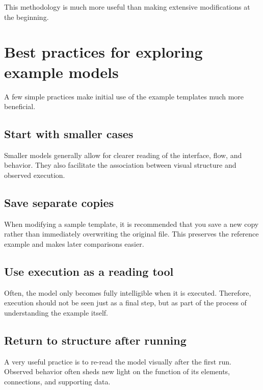 This methodology is much more useful than making extensive modifications at the beginning.

\section{Best practices for exploring example models}
\label{sec:cap4_boas_praticas_explorar_modelos}

A few simple practices make initial use of the example templates much more beneficial.

\subsection{Start with smaller cases}
\label{subsec:cap4_comece_por_casos_menores}

Smaller models generally allow for clearer reading of the interface, flow, and behavior. They also facilitate the association between visual structure and observed execution.

\subsection{Save separate copies}
\label{subsec:cap4_salve_copias_separadas}

When modifying a sample template, it is recommended that you save a new copy rather than immediately overwriting the original file. This preserves the reference example and makes later comparisons easier.

\subsection{Use execution as a reading tool}
\label{subsec:cap4_execucao_como_leitura}

Often, the model only becomes fully intelligible when it is executed. Therefore, execution should not be seen just as a final step, but as part of the process of understanding the example itself.

\subsection{Return to structure after running}
\label{subsec:cap4_volte_a_estrutura_apos_executar}

A very useful practice is to re-read the model visually after the first run. Observed behavior often sheds new light on the function of its elements, connections, and supporting data.

